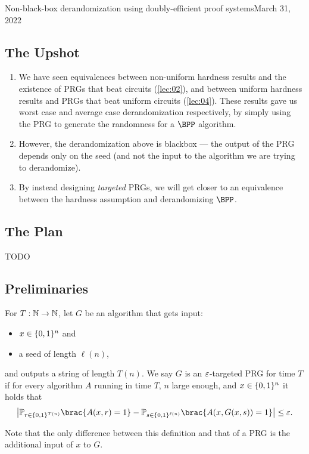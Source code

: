 \begin{lecture}{10}{Non-black-box derandomization using doubly-efficient proof
  systems}{March 31, 2022}\label{lec:10}

\subsection*{The Upshot}

\begin{enumerate}
  \item We have seen equivalences between non-uniform hardness results and the
    existence of PRGs that beat circuits (\cref{lec:02}), and between uniform
    hardness results and PRGs that beat uniform circuits (\cref{lec:04}).
    These results gave us worst case and average case derandomization
    respectively, by simply using the PRG to generate the randomness for a
    $\BPP$ algorithm.
  \item However, the derandomization above is blackbox --- the output of the
    PRG depends only on the seed (and not the input to the algorithm we are
    trying to derandomize).
  \item By instead designing \emph{targeted} PRGs, we will get closer to an
    equivalence between the hardness assumption and derandomizing $\BPP$.
\end{enumerate}

\subsection{The Plan}
TODO

\subsection{Preliminaries}

\begin{definition}%
  \label{defn:targeted-PRG}
  For $T : \mathbb{N} \to \mathbb{N}$, let $G$ be an algorithm that gets input:
  \begin{itemize}
    \item $x \in \{0, 1\}^n$ and
    \item a seed of length $\ell(n)$,
  \end{itemize}
  and outputs a string of length $T(n)$.
  We say $G$ is an $\varepsilon$-targeted PRG for time $T$ if for every algorithm
  $A$ running in time $T$, $n$ large enough, and $x \in \{0, 1\}^n$ it holds
  that
  \[
    \card*{ \Pr_{r \in \set{0, 1}^{T(n)}} \brac{ A(x, r) = 1 } -
    \Pr_{s \in \set{0, 1}^{\ell(n)}} \brac{ A(x, G(x, s)) = 1 }} \leq \eps.
  \]
\end{definition}
Note that the only difference between this definition and that of a PRG is
the additional input of $x$ to $G$.


\end{lecture}

